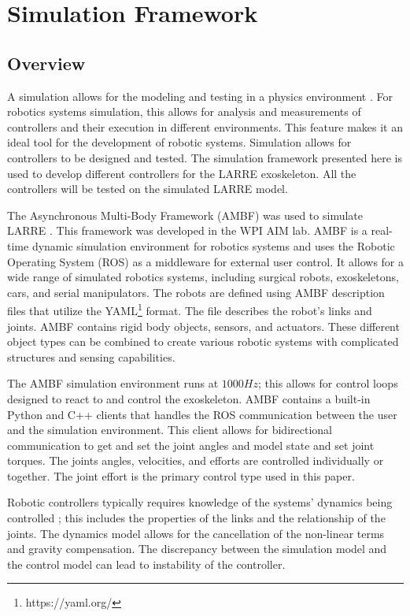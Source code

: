 \chapter{Simulation Framework}
\label{chap:sim}
\section{Overview}

A simulation allows for the modeling and testing in a physics environment \cite{vzlajpah2008simulation}. For robotics systems simulation, this allows for analysis and measurements of controllers and their execution in different environments. This feature makes it an ideal tool for the development of robotic systems. Simulation allows for controllers to be designed and tested. The simulation framework presented here is used to develop different controllers for the LARRE exoskeleton. All the controllers will be tested on the simulated LARRE model. 

The Asynchronous Multi-Body Framework (AMBF) was used to simulate LARRE \cite{AMBF}. This framework was developed in the WPI AIM lab. 
AMBF is a real-time dynamic simulation environment for robotics systems and uses the Robotic Operating System (ROS)\cite{quigley2009ros} as a middleware for external user control. It allows for a wide range of simulated robotics systems, including surgical robots, exoskeletons, cars, and serial manipulators. The robots are defined using AMBF description files that utilize the YAML\footnote{https://yaml.org/} format. The file describes the robot's links and joints. AMBF contains rigid body objects, sensors, and actuators. These different object types can be combined to create various robotic systems with complicated structures and sensing capabilities. 
 
 
 The AMBF simulation environment runs at $1000Hz$; this allows for control loops designed to react to and control the exoskeleton.  AMBF contains a built-in Python and C++ clients that handles the ROS communication between the user and the simulation environment. This client allows for bidirectional communication to get and set the joint angles and model state and set joint torques. The joints angles, velocities, and efforts are controlled individually or together. The joint effort is the primary control type used in this paper. 
 
Robotic controllers typically requires knowledge of the systems' dynamics being controlled \cite{piltan2012design}; this includes the properties of the links and the relationship of the joints. The dynamics model allows for the cancellation of the non-linear terms and gravity compensation. The discrepancy between the simulation model and the control model can lead to instability of the controller. 
 
